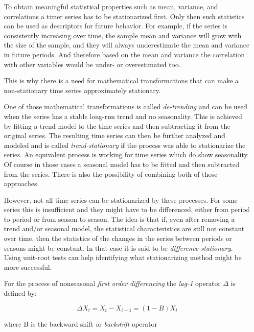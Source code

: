 To obtain meaningful statistical properties such as mean, variance, and correlations a timer series has to be stationarized first. Only then such statistics can be used as descriptors for future behavior.
For example, if the series is consistently increasing over time, the sample mean and variance will grow with the size of the sample, and they will always underestimate the mean and variance in future periods. And therefore based on the mean and variance the correlation with other variables would be under- or overestimated too.

This is why there is a need for mathematical transformations that can make a non-stationary time series approximately stationary.

One of those mathematical transformations is called \textit{de-trending} and can be used when the series has a stable long-run trend and no seasonality. This is achieved by fitting a trend model to the time series and then subtracting it from the original series. The resulting time series can then be further analyzed and modeled and is called \textit{trend-stationary} if the process was able to stationarize the series. An equivalent process is working for time series which do show seasonality. Of course in those cases a seasonal model has to be fitted and then subtracted from the series. There is also the possibility of combining both of those approaches.

However, not all time series can be stationarized by these processes. For some series this is insufficient and they might have to be differenced, either from period to period or from season to season. The idea is that if, even after removing a trend and/or seasonal model, the statistical characteristics are still not constant over time, then the statistics of the changes in the series between periods or seasons might be constant. In that case it is said to be \textit{difference-stationary}. Using unit-root tests can help identifying what stationarizing method might be more successful.

For the process of nonseasonal \textit{first order differencing} the \textit{lag-1} operator \(\Delta\) is defined by:

\begin{equation}\label{eq:seasonal_first_difference}
	\Delta X_t = X_t - X_{t-1} = (1-B)X_t
\end{equation}

where B is the backward shift or \textit{backshift} operator


